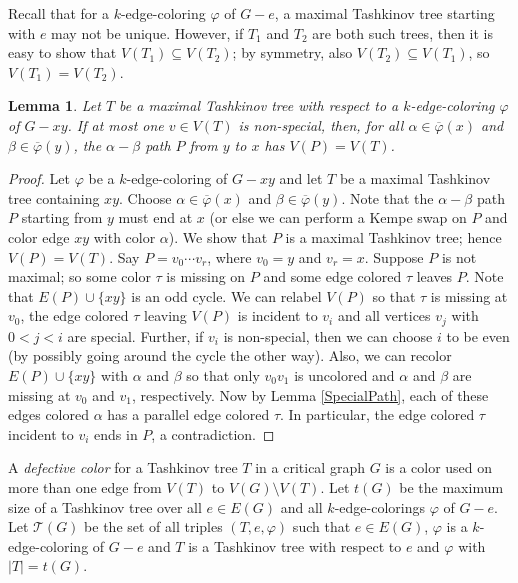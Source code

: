 \documentclass[12pt]{amsart}
\theoremstyle{plain}
\newtheorem{lem}[thm]{Lemma}
\theoremstyle{definition}
\theoremstyle{remark}
\newcommand{\fancy}[1]{\mathcal{#1}}
\newcommand{\T}{\fancy{T}}
\newcommand{\vph}{\varphi}
\newcommand{\vphn}{\overline{\varphi}}
\begin{document}
Recall that for a $k$-edge-coloring $\vph$ of $G-e$, a maximal Tashkinov tree
starting with $e$ may not be unique.  However, if $T_1$ and $T_2$ are both such
trees, then it is easy to show that $V(T_1)\subseteq V(T_2)$; by symmetry, also
$V(T_2)\subseteq V(T_1)$, so $V(T_1)=V(T_2)$.

\begin{lem}
\label{lem1}
Let $T$ be a maximal Tashkinov tree with respect to a $k$-edge-coloring $\vph$
of $G-xy$.  If at most one $v \in V(T)$ is non-special, then, for all $\alpha \in \vphn(x)$
and $\beta \in \vphn(y)$, the $\alpha-\beta$ path $P$ from $y$
to $x$ has $V(P) = V(T)$.
\end{lem}
\begin{proof}
Let $\vph$ be a $k$-edge-coloring of $G-xy$ and let $T$ be a maximal Tashkinov
tree containing $xy$.  Choose $\alpha \in \vphn(x)$ and $\beta \in \vphn(y)$.
Note that the $\alpha-\beta$ path $P$ starting from $y$ must end at $x$ (or
else we can perform a Kempe swap on $P$ and color edge $xy$ with color $\alpha$).
We show that $P$ is a maximal Tashkinov tree; hence $V(P) = V(T)$.  Say $P =
v_0\cdots v_r$, where $v_0=y$ and $v_r = x$. 
Suppose $P$ is not maximal; so some color $\tau$ is missing on
$P$ and some edge colored $\tau$ leaves $P$.  
Note that $E(P)\cup\{xy\}$ is an odd cycle.
We can relabel $V(P)$ so that $\tau$ is missing at $v_0$, the edge 
colored $\tau$ leaving $V(P)$ is incident to $v_i$ and all vertices $v_j$ with
$0<j<i$ are special.  Further, if $v_i$ is non-special, then we
can choose $i$ to be even (by possibly going around the cycle the other way).
Also, we can recolor $E(P)\cup\{xy\}$ with $\alpha$ and $\beta$ so that only
$v_0v_1$ is uncolored and $\alpha$ and $\beta$ are missing at $v_0$ and $v_1$,
respectively.
Now by Lemma \ref{SpecialPath}, %
each of these edges colored $\alpha$ has a parallel edge colored $\tau$.  
In particular, the edge colored $\tau$ incident to $v_i$ ends in $P$, a
contradiction.
\end{proof}

A \emph{defective color} for a
Tashkinov tree $T$  in a critical graph $G$ is a color used on more than one edge
from $V(T)$ to $V(G) \setminus V(T)$.  Let $t(G)$ be the maximum size of a Tashkinov tree over all $e \in E(G)$
and all $k$-edge-colorings $\vph$ of $G - e$.  Let $\T(G)$ be the set of all triples $(T,e,\vph)$ such that $e \in E(G)$, $\vph$ is a $k$-edge-coloring of $G-e$ and
$T$ is a Tashkinov tree with respect to $e$ and $\vph$ with $|T| = t(G)$.
\end{document}
